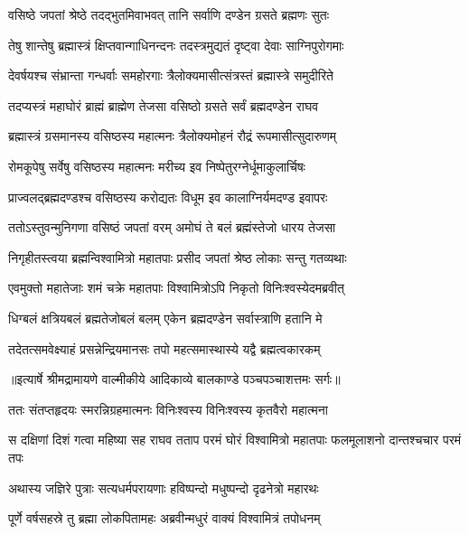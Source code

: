 \twolineshloka
{वसिष्ठे जपतां श्रेष्ठे तदद्भुतमिवाभवत्}
{तानि सर्वाणि दण्डेन ग्रसते ब्रह्मणः सुतः} %

\twolineshloka
{तेषु शान्तेषु ब्रह्मास्त्रं क्षिप्तवान्गाधिनन्दनः}
{तदस्त्रमुद्यतं दृष्ट्वा देवाः साग्निपुरोगमाः} %

\twolineshloka
{देवर्षयश्च संभ्रान्ता गन्धर्वाः समहोरगाः}
{त्रैलोक्यमासीत्संत्रस्तं ब्रह्मास्त्रे समुदीरिते} %

\twolineshloka
{तदप्यस्त्रं महाघोरं ब्राह्मं ब्राह्मेण तेजसा}
{वसिष्ठो ग्रसते सर्वं ब्रह्मदण्डेन राघव} %

\twolineshloka
{ब्रह्मास्त्रं ग्रसमानस्य वसिष्ठस्य महात्मनः}
{त्रैलोक्यमोहनं रौद्रं रूपमासीत्सुदारुणम्} %

\twolineshloka
{रोमकूपेषु सर्वेषु वसिष्ठस्य महात्मनः}
{मरीच्य इव निष्पेतुरग्नेर्धूमाकुलार्चिषः} %

\twolineshloka
{प्राज्वलद्ब्रह्मदण्डश्च वसिष्ठस्य करोद्यतः}
{विधूम इव कालाग्निर्यमदण्ड इवापरः} %

\twolineshloka
{ततोऽस्तुवन्मुनिगणा वसिष्ठं जपतां वरम्}
{अमोघं ते बलं ब्रह्मंस्तेजो धारय तेजसा} %

\twolineshloka
{निगृहीतस्त्वया ब्रह्मन्विश्वामित्रो महातपाः}
{प्रसीद जपतां श्रेष्ठ लोकाः सन्तु गतव्यथाः} %

\twolineshloka
{एवमुक्तो महातेजाः शमं चक्रे महातपाः}
{विश्वामित्रोऽपि निकृतो विनिःश्वस्येदमब्रवीत्} %

\twolineshloka
{धिग्बलं क्षत्रियबलं ब्रह्मतेजोबलं बलम्}
{एकेन ब्रह्मदण्डेन सर्वास्त्राणि हतानि मे} %

\twolineshloka
{तदेतत्समवेक्ष्याहं प्रसन्नेन्द्रियमानसः}
{तपो महत्समास्थास्ये यद्वै ब्रह्मत्वकारकम्} %


{॥इत्यार्षे श्रीमद्रामायणे वाल्मीकीये आदिकाव्ये बालकाण्डे पञ्चपञ्चाशत्तमः सर्गः॥}


\twolineshloka
{ततः संतप्तहृदयः स्मरन्निग्रहमात्मनः}
{विनिःश्वस्य विनिःश्वस्य कृतवैरो महात्मना} %

\threelineshloka
{स दक्षिणां दिशं गत्वा महिष्या सह राघव}
{तताप परमं घोरं विश्वामित्रो महातपाः}
{फलमूलाशनो दान्तश्चचार परमं तपः} %

\twolineshloka
{अथास्य जज्ञिरे पुत्राः सत्यधर्मपरायणाः}
{हविष्पन्दो मधुष्पन्दो दृढनेत्रो महारथः} %

\twolineshloka
{पूर्णे वर्षसहस्रे तु ब्रह्मा लोकपितामहः}
{अब्रवीन्मधुरं वाक्यं विश्वामित्रं तपोधनम्} %

